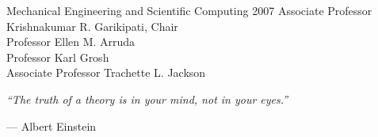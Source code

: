 
           {Mechanical Engineering and Scientific Computing} {2007}
           {Associate Professor Krishnakumar R. Garikipati, Chair\\
             Professor Ellen M. Arruda\\
             Professor Karl Grosh\\
             Associate Professor Trachette L. Jackson}

\initializefrontsections

\unnumberedpage
\vfill
\begin{center}
  {{\sl ``The truth of a theory is in your mind, not in your eyes.''}}
\end{center}
\smallskip
 \begin{center} --- Albert Einstein \end{center}
\vfill


\setcounter{page}{1}




